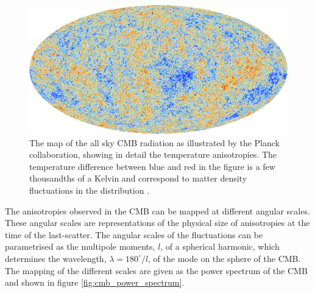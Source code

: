 \begin{figure}[ht!]
    \begin{center}
        \includegraphics[scale=0.2]{Chapter_1/Figures/Planck_CMB.jpg}
        \caption[The map of the all sky CMB radiation as illustrated by the Planck collaboration, showing in detail the temperature anisotropies.]%
        {The map of the all sky CMB radiation as illustrated by the Planck collaboration, showing in detail the temperature anisotropies. The temperature difference between blue and red in the figure is a few thousandths of a Kelvin and correspond to matter density fluctuations in the distribution \cite{plank_cmb_map}.}
        \label{fig:cmb_map}
        \end{center}
\end{figure}

The anisotropies observed in the CMB can be mapped at different angular scales. These angular scales are representations of the physical size of anisotropies at the time of the last-scatter. The angular scales of the fluctuations can be parametrised as the multipole moments, $l$, of a spherical harmonic, which determines the wavelength, $\lambda = 180^{\circ}/l$, of the mode on the sphere of the CMB. The mapping of the different scales are given as the power spectrum of the CMB and shown in figure \ref{fig:cmb_power_spectrum}.

